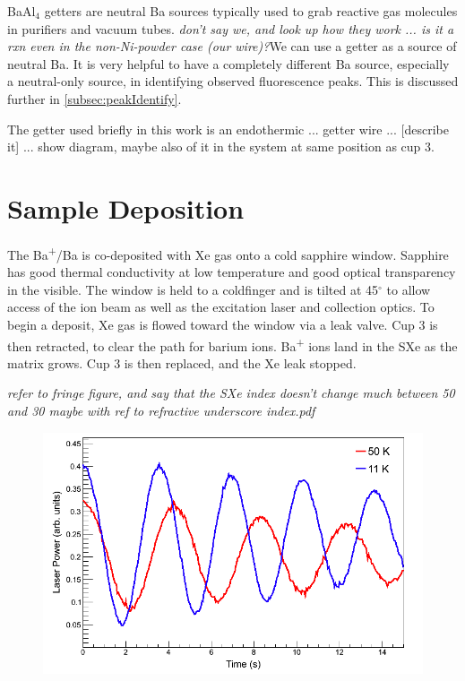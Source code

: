 BaAl$_{4}$ getters are neutral Ba sources typically used to grab reactive gas molecules in purifiers and vacuum tubes.  \emph{\color{red}don't say we, and look up how they work ... is it a rxn even in the non-Ni-powder case (our wire)?}We can use a getter as a source of neutral Ba.  It is very helpful to have a completely different Ba source, especially a neutral-only source, in identifying observed fluorescence peaks.  This is discussed further in \ref{subsec:peakIdentify}.

The getter used briefly in this work is an endothermic ... getter wire ... {\color{gray}[describe it]} ... show diagram, maybe also of it in the system at same position as cup 3.

\section{Sample Deposition}

The Ba\textsuperscript{+}/Ba is co-deposited with Xe gas onto a cold sapphire window.  Sapphire has good thermal conductivity at low temperature and good optical transparency in the visible.  The window is held to a coldfinger and is tilted at 45$^{\circ}$ to allow access of the ion beam as well as the excitation laser and collection optics.  To begin a deposit, Xe gas is flowed toward the window via a leak valve.  Cup 3 is then retracted, to clear the path for barium ions.  Ba\textsuperscript{+} ions land in the SXe as the matrix grows.  Cup 3 is then replaced, and the Xe leak stopped.

\emph{\color{red}refer to fringe figure, and say that the SXe index doesn't change much between 50 and 30 maybe with ref to refractive underscore index.pdf}

\begin{figure} %
        \centering
                \includegraphics[width=.7\textwidth]{figures/fringes_50K_vs_10K.png}
                \caption{}
\label{fig:fringes_50K_vs_10K}
\end{figure}

